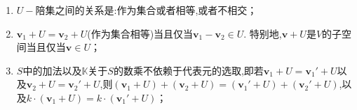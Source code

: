 \documentclass[../../main.tex]{subfiles}%
\begin{document}
\begin{proposition}[$U-$陪集的性质]\label{proposition:U-陪集的性质}
\begin{enumerate}[(1)]
\item \(U -\)陪集之间的关系是:作为集合或者相等,或者不相交；
\item  \(\boldsymbol{v}_1 + U=\boldsymbol{v}_2 + U\)(作为集合相等)当且仅当\(\boldsymbol{v}_1-\boldsymbol{v}_2\in U\). 特别地,\(\boldsymbol{v}+U\)是\(V\)的子空间当且仅当\(\boldsymbol{v}\in U\)；
\item  \(S\)中的加法以及\(\mathbb{K}\)关于\(S\)的数乘不依赖于代表元的选取,即若\(\boldsymbol{v}_1 + U=\boldsymbol{v}_1'+U\)以及\(\boldsymbol{v}_2 + U=\boldsymbol{v}_2'+U\),则\((\boldsymbol{v}_1 + U)+(\boldsymbol{v}_2 + U)=(\boldsymbol{v}_1'+U)+(\boldsymbol{v}_2'+U)\),以及\(k\cdot(\boldsymbol{v}_1 + U)=k\cdot(\boldsymbol{v}_1'+U)\)；
\end{enumerate}
\end{proposition}
\end{document}

